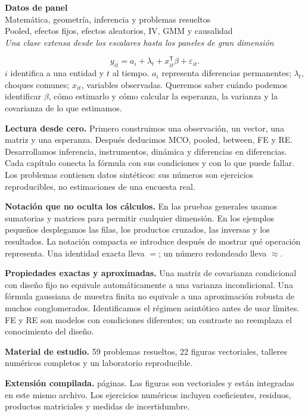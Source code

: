 \documentclass[11pt,a4paper]{article}
\theoremstyle{definition}
\newcounter{problema}
\newcommand{\eps}{\varepsilon}
\begin{document}
\begin{center}
{\Huge\bfseries\color{azul}Datos de panel}\\[6pt]
{\Large Matemática, geometría, inferencia y problemas resueltos}\\[5pt]
{\large Pooled, efectos fijos, efectos aleatorios, IV, GMM y causalidad}\\[4pt]
\textit{Una clase extensa desde los escalares hasta los paneles de gran dimensión}
\end{center}
\begin{idea}
\[
y_{it}=a_i+\lambda_t+x_{it}^{\mathsf T}\beta+\eps_{it}.
\]
$i$ identifica a una entidad y $t$ al tiempo. $a_i$ representa diferencias permanentes; $\lambda_t$, choques comunes; $x_{it}$, variables observadas. Queremos saber cuándo podemos identificar $\beta$, cómo estimarlo y cómo calcular la esperanza, la varianza y la covarianza de lo que estimamos.
\end{idea}
\textbf{Lectura desde cero.} Primero construimos una observación, un vector, una matriz y una esperanza. Después deducimos MCO, pooled, between, FE y RE. Desarrollamos inferencia, instrumentos, dinámica y diferencias en diferencias. Cada capítulo conecta la fórmula con sus condiciones y con lo que puede fallar. Los problemas contienen datos sintéticos: sus números son ejercicios reproducibles, no estimaciones de una encuesta real.

\textbf{Notación que no oculta los cálculos.} En las pruebas generales usamos sumatorias y matrices para permitir cualquier dimensión. En los ejemplos pequeños desplegamos las filas, los productos cruzados, las inversas y los resultados. La notación compacta se introduce después de mostrar qué operación representa. Una identidad exacta lleva $=$; un número redondeado lleva $\approx$.

\textbf{Propiedades exactas y aproximadas.} Una matriz de covarianza condicional con diseño fijo no equivale automáticamente a una varianza incondicional. Una fórmula gaussiana de muestra finita no equivale a una aproximación robusta de muchos conglomerados. Identificamos el régimen asintótico antes de usar límites. FE y RE son modelos con condiciones diferentes; un contraste no reemplaza el conocimiento del diseño.

\textbf{Material de estudio.} 59 problemas resueltos, 22 figuras vectoriales, talleres numéricos completos y un laboratorio reproducible.\par
\textbf{Extensión compilada.} \pageref{ultima-pagina} páginas. Las figuras son vectoriales y están integradas en este mismo archivo. Los ejercicios numéricos incluyen coeficientes, residuos, productos matriciales y medidas de incertidumbre.
\end{document}
